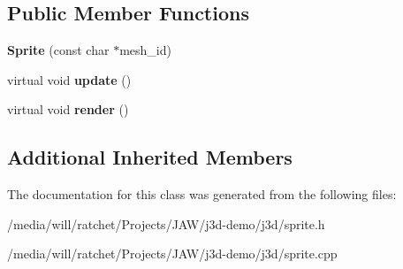 \subsection*{Public Member Functions}
\begin{DoxyCompactItemize}
\item 
\hypertarget{classj3d_1_1Sprite_a7392601fc95ec39c80157bd96a62ad66}{}{\bfseries Sprite} (const char $\ast$mesh\+\_\+id)\label{classj3d_1_1Sprite_a7392601fc95ec39c80157bd96a62ad66}

\item 
\hypertarget{classj3d_1_1Sprite_a59154f8d2e82ba5de5e119ec5d3c0826}{}virtual void {\bfseries update} ()\label{classj3d_1_1Sprite_a59154f8d2e82ba5de5e119ec5d3c0826}

\item 
\hypertarget{classj3d_1_1Sprite_a05623afcb83eed0a9fce70561f06a2fe}{}virtual void {\bfseries render} ()\label{classj3d_1_1Sprite_a05623afcb83eed0a9fce70561f06a2fe}

\end{DoxyCompactItemize}
\subsection*{Additional Inherited Members}


The documentation for this class was generated from the following files\+:\begin{DoxyCompactItemize}
\item 
/media/will/ratchet/\+Projects/\+J\+A\+W/j3d-\/demo/j3d/sprite.\+h\item 
/media/will/ratchet/\+Projects/\+J\+A\+W/j3d-\/demo/j3d/sprite.\+cpp\end{DoxyCompactItemize}
